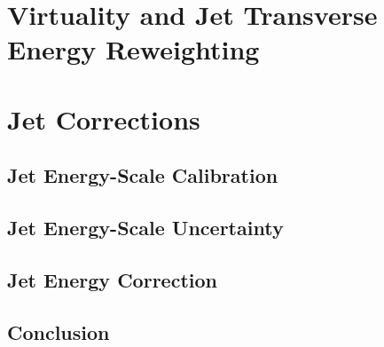 \section{Virtuality and Jet Transverse Energy Reweighting}
\label{sec:q2etrew}

 \newpage
 \section{Jet Corrections}
 \subsection{Jet Energy-Scale Calibration}
 
  \subsection{Jet Energy-Scale Uncertainty}
  
 \subsection{Jet Energy Correction}
 
 \subsection{Conclusion}
  